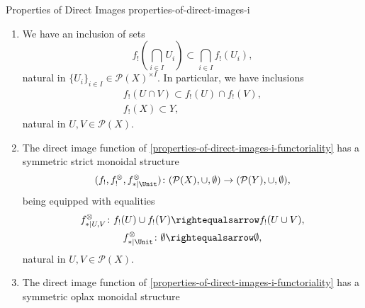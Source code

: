 \begin{proposition}{Properties of Direct Images \rmI}{properties-of-direct-images-i}
\begin{enumerate}
            \[
                f_{!}\left(\bigcup_{i\in I}U_{i}\right)%
                =%
                \bigcup_{i\in I}f_{!}(U_{i}),%
            \]%
            natural in $\{U_{i}\}_{i\in I}\in\mathcal{P}(X)^{\times I}$. In particular, we have equalities%
            \[
                \begin{gathered}
                    f_{!}(U)\cup f_{!}(V)                  = f_{!}(U\cup V),\\
                    f_{!}(\emptyset)                       = \emptyset,
                \end{gathered}
            \]%
            natural in $U,V\in\mathcal{P}(X)$.
        \item\label{properties-of-direct-images-i-oplax-preservation-of-limits}We have an inclusion of sets
            \[
                f_{!}\left(\bigcap_{i\in I}U_{i}\right)%
                \subset%
                \bigcap_{i\in I}f_{!}(U_{i}),%
            \]%
            natural in $\{U_{i}\}_{i\in I}\in\mathcal{P}(X)^{\times I}$. In particular, we have inclusions%
            \[
                \begin{gathered}
                    f_{!}(U\cap V) \subset f_{!}(U)\cap f_{!}(V),\\
                    f_{!}(X)        \subset Y,
                \end{gathered}
            \]%
            natural in $U,V\in\mathcal{P}(X)$.
        \item\label{properties-of-direct-images-i-symmetric-strict-monoidality-with-respect-to-unions}The direct image function of \cref{properties-of-direct-images-i-functoriality} has a symmetric strict monoidal structure
            \[
                (f_{!},f^{\otimes}_{!},f^{\otimes}_{*|\Unit})
                \colon
                (\mathcal{P}(X),\cup,\emptyset)
                \to
                (\mathcal{P}(Y),\cup,\emptyset),
            \]%
            being equipped with equalities%
            \[
                \begin{gathered}
                    f^{\otimes}_{*|U,V}   \colon f_{!}(U)\cup f_{!}(V) \rightequalsarrow f_{!}(U\cup V),\\
                    f^{\otimes}_{*|\Unit} \colon \emptyset             \rightequalsarrow \emptyset,
                \end{gathered}
            \]%
            natural in $U,V\in\mathcal{P}(X)$.
        \item\label{properties-of-direct-images-i-symmetric-oplax-monoidality-with-respect-to-intersections}The direct image function of \cref{properties-of-direct-images-i-functoriality} has a symmetric oplax monoidal structure

\end{enumerate}
\end{proposition}
